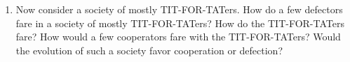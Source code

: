 \begin{itemize}
\begin{enumerate}
\item Now consider a society of mostly TIT-FOR-TATers. How do a few defectors fare in a society of mostly TIT-FOR-TATers? How do the TIT-FOR-TATers fare? How would a few cooperators fare with the TIT-FOR-TATers? Would the evolution of such a society favor cooperation or defection?

\end{enumerate}








\end{itemize}

%


 